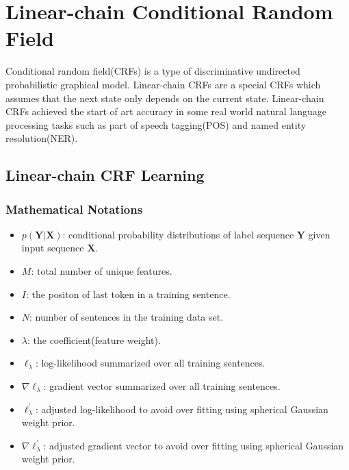 
\chapter[Linear-chain Conditional Random Field]{Linear-chain Conditional Random Field}
Conditional random field(CRFs) is a type of discriminative undirected probabilistic graphical model.
Linear-chain CRFs are a special CRFs which assumes that the next state only depends on the current state. 
Linear-chain CRFs achieved the start of art accuracy in some real world natural language processing tasks such
as part of speech tagging(POS) and named entity resolution(NER).

\section{Linear-chain CRF Learning}

\subsection{Mathematical Notations}
\begin{itemize}
\item $p(\boldsymbol Y | \boldsymbol X)$: conditional probability distributions of label sequence $\boldsymbol Y$ given input sequence $\boldsymbol X$.
\item $M$: total number of unique features.
\item $I$: the positon of last token in a training sentence.
\item $N$: number of sentences in the training data set.
\item $\lambda$: the coefficient(feature weight).
\item $\ell_{\lambda}$: log-likelihood summarized over all training sentences.
\item $\nabla \ell_{\lambda}$: gradient vector summarized over all training sentences.
\item $\ell_{\lambda}^\prime$: adjusted log-likelihood to avoid over fitting using spherical Gaussian weight prior.
\item $\nabla \ell_{\lambda}^\prime$: adjusted gradient vector to avoid over fitting using spherical Gaussian weight prior.

\end{itemize}

